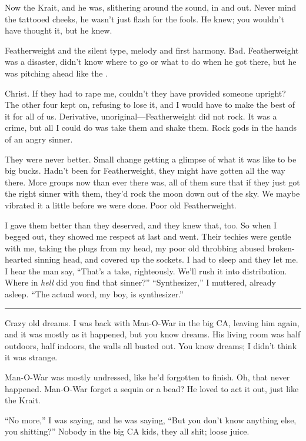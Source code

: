 Now the Krait, and he was, slithering around the sound, in and out. Never mind the tattooed cheeks, he wasn't just flash for the fools. He knew; you wouldn't have thought it, but he knew.

Featherweight and the silent type, melody and first harmony. Bad. Featherweight was a disaster, didn't know where to go or what to do when he got there, but he was pitching ahead like the .

Christ. If they had to rape me, couldn't they have provided someone upright? The other four kept on, refusing to lose it, and I would have to make the best of it for all of us. Derivative, unoriginal—Featherweight did not rock. It was a crime, but all I could do was take them and shake them. Rock gods in the hands of an angry sinner.

They were never better. Small change getting a glimpse of what it was like to be big bucks. Hadn't been for Featherweight, they might have gotten all the way there. More groups now than ever there was, all of them sure that if they just got the right sinner with them, they'd rock the moon down out of the sky.
We maybe vibrated it a little before we were done. Poor old Featherweight.

I gave them better than they deserved, and they knew that, too. So when I begged out, they showed me respect at last and went. Their techies were gentle with me, taking the plugs from my head, my poor old throbbing abused broken-hearted sinning head, and covered up the sockets. I had to sleep and they let me. I hear the man say, ``That's a take, righteously. We'll rush it into distribution. Where in \textit{hell} did you find that sinner?''
``Synthesizer,'' I muttered, already asleep. ``The actual word, my boy, is synthesizer.''

\fancybreak{* * *}

Crazy old dreams. I was back with Man-O-War in the big CA, leaving him again, and it was mostly as it happened, but you know dreams. His living room was half outdoors, half indoors, the walls all busted out. You know dreams; I didn't think it was strange.

Man-O-War was mostly undressed, like he'd forgotten to finish. Oh, that never happened. Man-O-War forget a sequin or a bead? He loved to act it out, just like the Krait.

``No more,'' I was saying, and he was saying, ``But you don't know anything else, you shitting?'' Nobody in the big CA kids, they all shit; loose juice.


